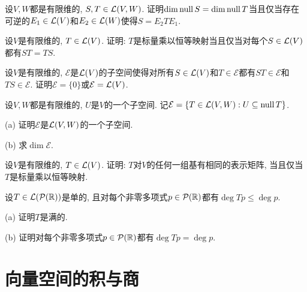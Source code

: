 \begin{exercise} %
	设$V,W$都是有限维的, $S,T \in \mathcal{L} (V,W)$. 证明$\dim \operatorname{null} S = \dim \operatorname{null} T$当且仅当存在可逆的$E_1 \in \mathcal{L} (V)$和$E_2 \in \mathcal{L} (W)$使得$S=E_2TE_1$. 
\end{exercise}
\vspace{1em}

\begin{exercise} %
	设$V$是有限维的, $T \in \mathcal{L} (V)$. 证明: $T$是标量乘以恒等映射当且仅当对每个$S \in \mathcal{L} (V)$都有$ST=TS$. 
\end{exercise}
\vspace{1em}

\begin{exercise} %
	设$V$是有限维的, $\mathcal{E}$是$\mathcal{L} (V)$的子空间使得对所有$S \in \mathcal{L} (V)$和$T \in \mathcal{E}$都有$ST \in \mathcal{E}$和$TS \in \mathcal{E}$. 证明$\mathcal{E}=\{ 0 \}$或$\mathcal{E}=\mathcal{L} (V)$. 
\end{exercise}
\vspace{1em}

\begin{exercise} %
	设$V,W$都是有限维的, $U$是$V$的一个子空间. 记$\mathcal{E} = \{ T \in \mathcal{L} (V,W):U \subseteq \operatorname{null} T \}$. 
	
	(a) 证明$\mathcal{E}$是$\mathcal{L} (V,W)$的一个子空间. 
	
	(b) 求$\dim \mathcal{E}$. 
\end{exercise}
\vspace{1em}

\begin{exercise} %
	设$V$是有限维的, $T \in \mathcal{L} (V)$. 证明: $T$对$V$的任何一组基有相同的表示矩阵, 当且仅当$T$是标量乘以恒等映射. 
\end{exercise}
\vspace{1em}

\begin{exercise} %
	设$T \in \mathcal{L} (\mathcal{P} (\mathbb{R}))$是单的, 且对每个非零多项式$p \in \mathcal{P}(\mathbb{R})$都有$\deg Tp \leq \deg p$. 
	
	(a) 证明$T$是满的. 
	
	(b) 证明对每个非零多项式$p \in \mathcal{P}(\mathbb{R})$都有$\deg Tp = \deg p$. 
\end{exercise}


\newpage
\section{向量空间的积与商}

